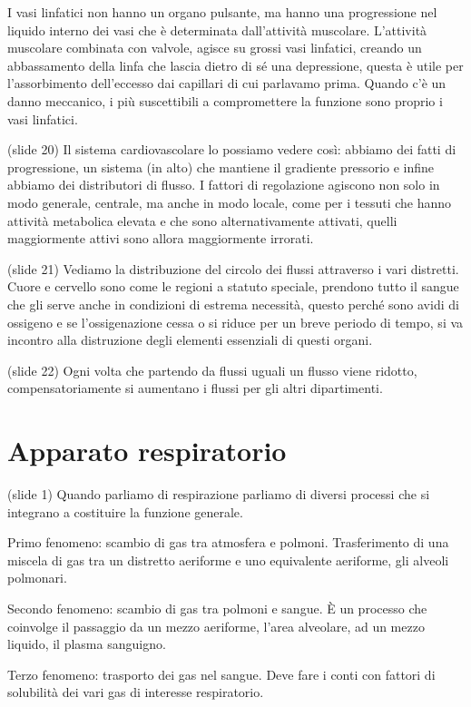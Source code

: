 \documentclass[a4paper,12pt]{article}
\begin{document}
I vasi linfatici non hanno un organo pulsante, ma hanno una progressione nel liquido interno dei vasi che è determinata dall'attività muscolare. L'attività muscolare combinata con valvole, agisce su grossi vasi linfatici, creando un abbassamento della linfa che lascia dietro di sé una depressione, questa è utile per l'assorbimento dell'eccesso dai capillari di cui parlavamo prima. Quando c'è un danno meccanico, i più suscettibili a compromettere la funzione sono proprio i vasi linfatici.

(slide 20) Il sistema cardiovascolare lo possiamo vedere così: abbiamo dei fatti di progressione, un sistema (in alto) che mantiene il gradiente pressorio e infine abbiamo dei distributori di flusso.  I fattori di regolazione agiscono non solo in modo generale, centrale, ma anche in modo locale, come per i tessuti che hanno attività metabolica elevata e che sono alternativamente attivati, quelli maggiormente attivi sono allora maggiormente irrorati.

(slide 21) Vediamo la distribuzione del circolo dei flussi attraverso i vari distretti. Cuore e cervello sono come le regioni a statuto speciale, prendono tutto il sangue che gli serve anche in condizioni di estrema necessità, questo perché sono avidi di ossigeno e se l'ossigenazione cessa o si riduce per un breve periodo di tempo, si va incontro alla distruzione degli elementi essenziali di questi organi. 

(slide 22) Ogni volta che partendo da flussi uguali un flusso viene ridotto, compensatoriamente si aumentano i flussi per gli altri dipartimenti.

\section{Apparato respiratorio}
(slide 1) Quando parliamo di respirazione parliamo di diversi processi che si integrano a costituire la funzione generale.

Primo fenomeno: scambio di gas tra atmosfera e polmoni. Trasferimento di una miscela di gas tra un distretto aeriforme e uno equivalente aeriforme, gli alveoli polmonari.

Secondo fenomeno: scambio di gas tra polmoni e sangue. È un processo che coinvolge il passaggio da un mezzo aeriforme, l'area alveolare, ad un mezzo liquido, il plasma sanguigno. 

Terzo fenomeno: trasporto dei gas nel sangue. Deve fare i conti con fattori di solubilità dei vari gas di interesse respiratorio.
\end{document}
